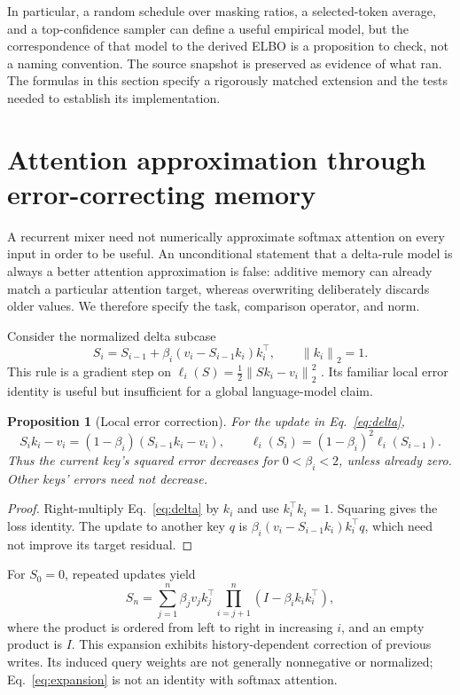 \documentclass{article}
\newtheorem{proposition}[theorem]{Proposition}
\theoremstyle{remark}\newtheorem{remark}[theorem]{Remark}
\newcommand{\norm}[1]{\left\lVert #1\right\rVert}
\begin{document}
In particular, a random schedule over masking ratios, a selected-token average, and a top-confidence sampler can define a useful empirical model, but the correspondence of that model to the derived ELBO is a proposition to check, not a naming convention. The source snapshot is preserved as evidence of what ran. The formulas in this section specify a rigorously matched extension and the tests needed to establish its implementation.

\section{Attention approximation through error-correcting memory}
\label{sec:attention}\label{sec:overwrite}
A recurrent mixer need not numerically approximate softmax attention on every input in order to be useful. An unconditional statement that a delta-rule model is always a better attention approximation is false: additive memory can already match a particular attention target, whereas overwriting deliberately discards older values. We therefore specify the task, comparison operator, and norm.

Consider the normalized delta subcase
\begin{equation}
 S_i=S_{i-1}+\beta_i(v_i-S_{i-1}k_i)k_i^\top,
 \qquad \norm{k_i}_2=1.
 \label{eq:delta}
\end{equation}
This rule is a gradient step on $\ell_i(S)=\tfrac12\norm{Sk_i-v_i}_2^2$ \cite{deltanet}. Its familiar local error identity is useful but insufficient for a global language-model claim.

\begin{proposition}[Local error correction]
\label{prop:local}
For the update in Eq.~\eqref{eq:delta},
\begin{equation}
 S_i k_i-v_i=(1-\beta_i)(S_{i-1}k_i-v_i),\qquad
 \ell_i(S_i)=(1-\beta_i)^2\ell_i(S_{i-1}).
\end{equation}
Thus the current key's squared error decreases for $0<\beta_i<2$, unless already zero. Other keys' errors need not decrease.
\end{proposition}
\begin{proof}
Right-multiply Eq.~\eqref{eq:delta} by $k_i$ and use $k_i^\top k_i=1$. Squaring gives the loss identity. The update to another key $q$ is $\beta_i(v_i-S_{i-1}k_i)k_i^\top q$, which need not improve its target residual.
\end{proof}

For $S_0=0$, repeated updates yield
\begin{equation}
 S_n=\sum_{j=1}^{n}\beta_jv_jk_j^\top
 \prod_{i=j+1}^{n}(I-\beta_i k_i k_i^\top),
 \label{eq:expansion}
\end{equation}
where the product is ordered from left to right in increasing $i$, and an empty product is $I$. This expansion exhibits history-dependent correction of previous writes. Its induced query weights are not generally nonnegative or normalized; Eq.~\eqref{eq:expansion} is not an identity with softmax attention.
\end{document}
